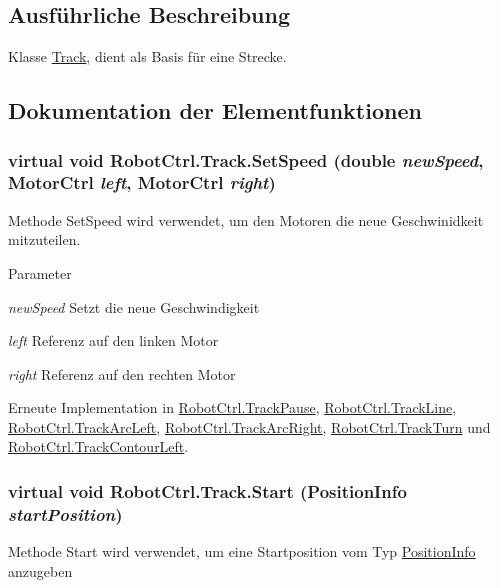 \subsection{Ausführliche Beschreibung}
Klasse \hyperlink{class_robot_ctrl_1_1_track}{Track}, dient als Basis f\"{u}r eine Strecke. 

\subsection{Dokumentation der Elementfunktionen}
\hypertarget{class_robot_ctrl_1_1_track_a9abc3ccf4bf1d9db8d461f2cb4b4b0d3}{
\subsubsection[{SetSpeed}]{\setlength{\rightskip}{0pt plus 5cm}virtual void RobotCtrl.Track.SetSpeed (double {\em newSpeed}, \/  {\bf MotorCtrl} {\em left}, \/  {\bf MotorCtrl} {\em right})}}
\label{class_robot_ctrl_1_1_track_a9abc3ccf4bf1d9db8d461f2cb4b4b0d3}
Methode SetSpeed wird verwendet, um den Motoren die neue Geschwinidkeit mitzuteilen.


\begin{DoxyParams}{Parameter}
\item[{\em newSpeed}]Setzt die neue Geschwindigkeit \item[{\em left}]Referenz auf den linken Motor \item[{\em right}]Referenz auf den rechten Motor \end{DoxyParams}


Erneute Implementation in \hyperlink{class_robot_ctrl_1_1_track_pause_a47133c69e455aa2c04f1bc3a6b5999b6}{RobotCtrl.TrackPause}, \hyperlink{class_robot_ctrl_1_1_track_line_ad73ae0e8f7aea1765834ab90f5bd6b23}{RobotCtrl.TrackLine}, \hyperlink{class_robot_ctrl_1_1_track_arc_left_aee8e8c1da176807436c2946e39bbd6ae}{RobotCtrl.TrackArcLeft}, \hyperlink{class_robot_ctrl_1_1_track_arc_right_a7b2db0d3709e4919da0645a6713a87bb}{RobotCtrl.TrackArcRight}, \hyperlink{class_robot_ctrl_1_1_track_turn_a065e23cd313e746cb65496c9b9df0955}{RobotCtrl.TrackTurn} und \hyperlink{class_robot_ctrl_1_1_track_contour_left_ae7938250af614625cd08a498c0f15195}{RobotCtrl.TrackContourLeft}.

\hypertarget{class_robot_ctrl_1_1_track_a91c0b372e1c332ae1aa18368df116633}{
\subsubsection[{Start}]{\setlength{\rightskip}{0pt plus 5cm}virtual void RobotCtrl.Track.Start ({\bf PositionInfo} {\em startPosition})}}
\label{class_robot_ctrl_1_1_track_a91c0b372e1c332ae1aa18368df116633}
Methode Start wird verwendet, um eine Startposition vom Typ \hyperlink{struct_robot_ctrl_1_1_position_info}{PositionInfo} anzugeben


